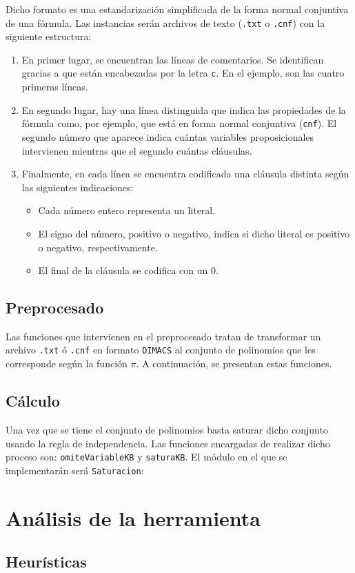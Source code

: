 Dicho formato es una estandarización simplificada de la forma normal conjuntiva de una fórmula. Las instancias serán archivos de texto (\texttt{.txt} o \texttt{.cnf}) con la siguiente estructura:

\begin{enumerate}
\item En primer lugar, se encuentran las líneas de comentarios. Se identifican gracias a que están encabezadas por la letra \texttt{c}. En el ejemplo, son las cuatro primeras líneas.
\item En segundo lugar, hay una línea distinguida que indica las propiedades de la fórmula como, por ejemplo, que está en forma normal conjuntiva (\texttt{cnf}). El segundo número que aparece indica cuántas variables proposicionales intervienen mientras que el segundo cuántas cláusulas.
\item Finalmente, en cada línea se encuentra codificada una cláusula distinta según las siguientes indicaciones:
\begin{itemize}
\item Cada número entero representa un literal.
\item El signo del número, positivo o negativo, indica si dicho literal es positivo o negativo, respectivamente.
\item El final de la cláusula se codifica con un 0.
\end{itemize} 
\end{enumerate}

\subsection{Preprocesado}

Las funciones que intervienen en el preprocesado tratan de transformar un archivo \texttt{.txt} ó \texttt{.cnf} en formato \texttt{DIMACS} al conjunto de polinomios que les corresponde según la función $\pi$. A continuación, se presentan estas funciones.


\newpage
\subsection{Cálculo}

Una vez que se tiene el conjunto de polinomios basta saturar dicho conjunto usando la regla de independencia. Las funciones encargadas de realizar dicho proceso son: \texttt{omiteVariableKB} y \texttt{saturaKB}. El módulo en el que se implementarán será \texttt{Saturacion}:


\newpage
\section{Análisis de la herramienta}

\subsection{Heurísticas}